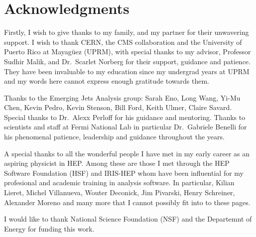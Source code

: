 \chapter*{Acknowledgments}

Firstly, I wish to give thanks to my family, and my partner for their unwavering support. 
I wish to thank CERN, the CMS collaboration and the University of Puerto Rico at Mayagüez (UPRM), with special thanks to my advisor, Professor Sudhir Malik, and Dr.~Scarlet Norberg for their support, guidance and patience. They have been invaluable to my education since my undergrad years at UPRM and my words here cannot express enough gratitude towards them.

Thanks to the Emerging Jets Analysis group: Sarah Eno, Long Wang, Yi-Mu Chen, Kevin Pedro, Kevin Stenson, Bill Ford, Keith Ulmer, Claire Savard. Special thanks to Dr.~Alexx Perloff for his guidance and mentoring. Thanks to scientists and staff at Fermi National Lab in particular Dr.~Gabriele Benelli for his phenomenal patience, leadership and guidance throughout the years.

A special thanks to all the wonderful people I have met in my early career as an aspiring physicist in HEP. Among these are those I met through the HEP Software Foundation (HSF) and IRIS-HEP whom have been influential for my profesional and academic training in analysis software. In particular, Kilian Lieret, Michel Villanueva, Wouter Deconick, Jim Pivarski, Henry Schreiner, Alexander Moreno and many more that I cannot possibly fit into to these pages.

I would like to thank National Science Foundation (NSF) and the Departemnt of Energy for funding this work.
